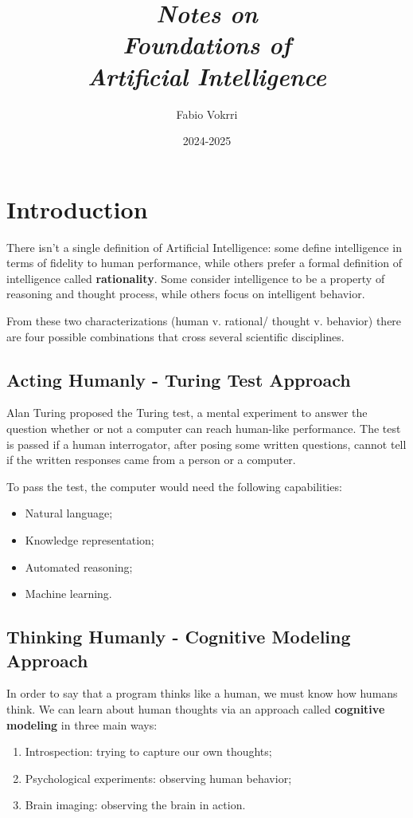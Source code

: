 \documentclass{article}
\title{\small{\textit{Notes on}}\\ \huge{\textit{Foundations of \\ Artificial Intelligence}}}
\author{Fabio Vokrri}
\date{2024-2025}
\begin{document}
\maketitle
\newpage
\tableofcontents

\clearpage
\section{Introduction}
There isn't a single definition of Artificial Intelligence: some define intelligence in terms of fidelity to human performance, while others prefer a formal definition of intelligence called \textbf{rationality}. Some consider intelligence to be a property of reasoning and thought process, while others focus on intelligent behavior.  

From these two characterizations (human v. rational/ thought v. behavior) there are four possible combinations that cross several scientific disciplines.

\subsection{Acting Humanly - Turing Test Approach}
Alan Turing proposed the Turing test, a mental experiment to answer the question whether or not a computer can reach human-like performance. The test is passed if a human interrogator, after posing some written questions, cannot tell if the written responses came from a person or a computer.

To pass the test, the computer would need the following capabilities:
\begin{itemize}
    \item Natural language;
    \item Knowledge representation;
    \item Automated reasoning;
    \item Machine learning.
\end{itemize}

\subsection{Thinking Humanly - Cognitive Modeling Approach}
In order to say that a program thinks like a human, we must know how humans think. We can learn about human thoughts via an approach called \textbf{cognitive modeling} in three main ways:
\begin{enumerate}
    \item Introspection: trying to capture our own thoughts;
    \item Psychological experiments: observing human behavior;
    \item Brain imaging: observing the brain in action.
\end{enumerate}
\end{document}
